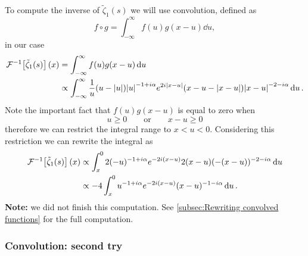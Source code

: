 \documentclass[%
 aip,
 jmp,%
 amsmath,amssymb,
 reprint,%
]{revtex4-2}
\begin{document}
To compute the inverse of $\tilde{\zeta}_1(s)$ we will use convolution, defined as
\begin{equation*}
f\circ g = \int_{-\infty}^\infty f(u)g(x-u)\dd{u},
\end{equation*}
in our case
\begin{equation}
\begin{aligned}
\mathcal{F}^{-1}\qty[\tilde{\zeta}_1(s)](x) &=  \int_{-\infty}^\infty f(u)g(x-u)\dd{u}\\
&\propto \int_{-\infty}^\infty \frac{1}{u}(u-\abs{u}){\abs{u}}^{-1+i\alpha} e^{2i\abs{x-u}}(x-u - \abs{x-u}){\abs{x-u}}^{-2-i\alpha}\dd{u}.
\end{aligned}
\end{equation}
Note the important fact that $f(u)g(x-u)$ is equal to zero when
\begin{equation*}
u \geq 0 \qquad \text{or} \qquad x-u \geq 0
\end{equation*}
therefore we can restrict the integral range to $x < u < 0$. Considering this restriction we can rewrite the integral as
\begin{equation}
\begin{aligned}
\mathcal{F}^{-1}\qty[\tilde{\zeta}_1(s)](x) &\propto \int_x^0 2 (-u)^{-1 + i\alpha} e^{-2i(x-u)}2(x-u)(-(x-u))^{-2 - i\alpha}\dd{u}\\
& \propto -4\int_x^0 u^{-1 + i\alpha}e^{-2i(x-u)}(x-u)^{-1 - i\alpha}\dd{u}.
\end{aligned}
\end{equation}
\textbf{Note:} we did not finish this computation. See \eqref{subsec:Rewriting convolved functions} for the full computation.

\subsubsection{Convolution: second try}\label{subsec:Rewriting convolved functions}
\end{document}
